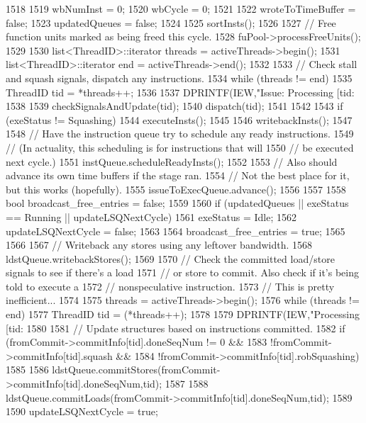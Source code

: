 \begin{DoxyCode}
1518 {
1519     wbNumInst = 0;
1520     wbCycle = 0;
1521 
1522     wroteToTimeBuffer = false;
1523     updatedQueues = false;
1524 
1525     sortInsts();
1526 
1527     // Free function units marked as being freed this cycle.
1528     fuPool->processFreeUnits();
1529 
1530     list<ThreadID>::iterator threads = activeThreads->begin();
1531     list<ThreadID>::iterator end = activeThreads->end();
1532 
1533     // Check stall and squash signals, dispatch any instructions.
1534     while (threads != end) {
1535         ThreadID tid = *threads++;
1536 
1537         DPRINTF(IEW,"Issue: Processing [tid:%
1538 
1539         checkSignalsAndUpdate(tid);
1540         dispatch(tid);
1541     }
1542 
1543     if (exeStatus != Squashing) {
1544         executeInsts();
1545 
1546         writebackInsts();
1547 
1548         // Have the instruction queue try to schedule any ready instructions.
1549         // (In actuality, this scheduling is for instructions that will
1550         // be executed next cycle.)
1551         instQueue.scheduleReadyInsts();
1552 
1553         // Also should advance its own time buffers if the stage ran.
1554         // Not the best place for it, but this works (hopefully).
1555         issueToExecQueue.advance();
1556     }
1557 
1558     bool broadcast_free_entries = false;
1559 
1560     if (updatedQueues || exeStatus == Running || updateLSQNextCycle) {
1561         exeStatus = Idle;
1562         updateLSQNextCycle = false;
1563 
1564         broadcast_free_entries = true;
1565     }
1566 
1567     // Writeback any stores using any leftover bandwidth.
1568     ldstQueue.writebackStores();
1569 
1570     // Check the committed load/store signals to see if there's a load
1571     // or store to commit.  Also check if it's being told to execute a
1572     // nonspeculative instruction.
1573     // This is pretty inefficient...
1574 
1575     threads = activeThreads->begin();
1576     while (threads != end) {
1577         ThreadID tid = (*threads++);
1578 
1579         DPRINTF(IEW,"Processing [tid:%
1580 
1581         // Update structures based on instructions committed.
1582         if (fromCommit->commitInfo[tid].doneSeqNum != 0 &&
1583             !fromCommit->commitInfo[tid].squash &&
1584             !fromCommit->commitInfo[tid].robSquashing) {
1585 
1586             ldstQueue.commitStores(fromCommit->commitInfo[tid].doneSeqNum,tid);
1587 
1588             ldstQueue.commitLoads(fromCommit->commitInfo[tid].doneSeqNum,tid);
1589 
1590             updateLSQNextCycle = true;
}}}
\end{DoxyCode}
